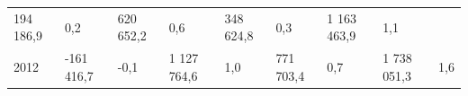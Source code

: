 \begin{longtable}[]{@{}lllllllll@{}}
\begin{minipage}[t]{0.10\columnwidth}
194 186,9\strut
\end{minipage} & \begin{minipage}[t]{0.06\columnwidth}\raggedright
0,2\strut
\end{minipage} & \begin{minipage}[t]{0.16\columnwidth}\raggedright
620 652,2\strut
\end{minipage} & \begin{minipage}[t]{0.06\columnwidth}\raggedright
0,6\strut
\end{minipage} & \begin{minipage}[t]{0.12\columnwidth}\raggedright
348 624,8\strut
\end{minipage} & \begin{minipage}[t]{0.06\columnwidth}\raggedright
0,3\strut
\end{minipage} & \begin{minipage}[t]{0.10\columnwidth}\raggedright
1 163 463,9\strut
\end{minipage} & \begin{minipage}[t]{0.06\columnwidth}\raggedright
1,1\strut
\end{minipage}\tabularnewline
\begin{minipage}[t]{0.05\columnwidth}\raggedright
2012\strut
\end{minipage} & \begin{minipage}[t]{0.10\columnwidth}\raggedright
-161 416,7\strut
\end{minipage} & \begin{minipage}[t]{0.06\columnwidth}\raggedright
-0,1\strut
\end{minipage} & \begin{minipage}[t]{0.16\columnwidth}\raggedright
1 127 764,6\strut
\end{minipage} & \begin{minipage}[t]{0.06\columnwidth}\raggedright
1,0\strut
\end{minipage} & \begin{minipage}[t]{0.12\columnwidth}\raggedright
771 703,4\strut
\end{minipage} & \begin{minipage}[t]{0.06\columnwidth}\raggedright
0,7\strut
\end{minipage} & \begin{minipage}[t]{0.10\columnwidth}\raggedright
1 738 051,3\strut
\end{minipage} & \begin{minipage}[t]{0.06\columnwidth}\raggedright
1,6\strut
\end{minipage}\tabularnewline

\end{longtable}
